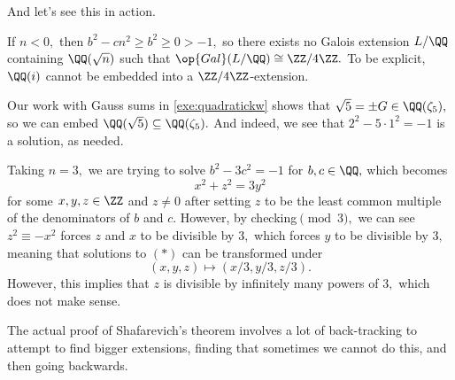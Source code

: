 \documentclass[../notes.tex]{subfiles}
\begin{document}
And let's see this in action.
\begin{example}
	If $n<0,$ then $b^2-cn^2\ge b^2\ge0>-1,$ so there exists no Galois extension $L/\QQ$ containing $\QQ(\sqrt n)$ such that $\op{Gal}(L/\QQ)\cong\ZZ/4\ZZ.$ To be explicit, $\QQ(i)$ cannot be embedded into a $\ZZ/4\ZZ$-extension.
\end{example}
\begin{example}
	Our work with Gauss sums in \autoref{exe:quadratickw} shows that $\sqrt 5=\pm G\in\QQ(\zeta_5),$ so we can embed $\QQ(\sqrt 5)\subseteq\QQ(\zeta_5).$ And indeed, we see that $2^2-5\cdot1^2=-1$ is a solution, as needed.
\end{example}
\begin{example}
	Taking $n=3,$ we are trying to solve $b^2-3c^2=-1$ for $b,c\in\QQ,$ which becomes
	\[x^2+z^2=3y^2\tag{$*$}\]
	for some $x,y,z\in\ZZ$ and $z\ne0$ after setting $z$ to be the least common multiple of the denominators of $b$ and $c.$ However, by checking$\pmod3,$ we can see $z^2\equiv-x^2$ forces $z$ and $x$ to be divisible by $3,$ which forces $y$ to be divisible by $3,$ meaning that solutions to $(*)$ can be transformed under
	\[(x,y,z)\mapsto(x/3,y/3,z/3).\]
	However, this implies that $z$ is divisible by infinitely many powers of $3,$ which does not make sense.
\end{example}
\begin{remark}
	The actual proof of {Shafarevich}'s theorem involves a lot of back-tracking to attempt to find bigger extensions, finding that sometimes we cannot do this, and then going backwards.
\end{remark}
\end{document}
